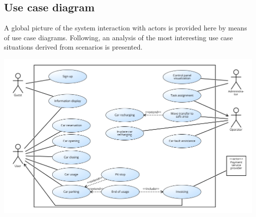 \subsection{Use case diagram}
	A global picture of the system interaction with actors is provided here by means of use case diagrams. Following, an analysis of the most interesting use case situations derived from scenarios is presented.

	\includegraphics[width=\textwidth]{img/use_case.png}
	
